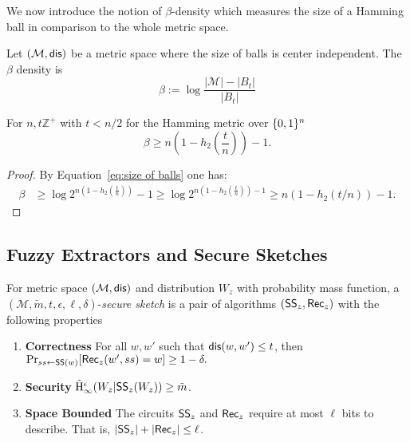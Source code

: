 \noindent
We now introduce the notion of $\beta$-density which measures the size of a Hamming ball in comparison to the whole metric space.
\begin{definition}
Let $(\mathcal{M}, \mathsf{dis})$ be a metric space where the size of balls is center independent.  The $\beta$ density is
\[
\beta := \log{\frac{|\mathcal{M}|- |B_t|}{|B_t|}} 
\]
\label{def:b density}
\end{definition}
\begin{claim} 
For $n, t\mathbb{Z}^+$ with $t<n/2$ for the Hamming metric over $\{0, 1\}^n$
\[
\beta \ge n\left(1-h_2\left(\frac{t}{n}\right)\right)-1.
\]

\end{claim}

\begin{proof}
By Equation~\ref{eq:size of balls} one has: 
\begin{align*}
\beta&\ge \log{2^{n\left(1-h_2\left(\frac{t}{n}\right)\right)} -1} \ge \log{2^{n\left(1-h_2\left(\frac{t}{n}\right)\right)-1} } \ge n(1-h_2(t/n))-1.
\end{align*}
\end{proof}


    \subsection{Fuzzy Extractors and Secure Sketches}
\begin{definition}
For metric space $(\mathcal{M}, \mathsf{dis})$ and distribution $W_z$ with probability mass function, a $(\mathcal{M}, \tilde{m}, t, \epsilon, \ell, \delta)$-\emph{secure sketch} is a pair of algorithms $({\mathsf{SS}}_z, {\mathsf{Rec}}_z)$ with the following properties 
\begin{enumerate} 
\itemsep0em
\item \textbf{Correctness} For all $w, w'$ such that $\mathsf{dis}(w, w')\le t$, then $\Pr_{ss \leftarrow {\ensuremath{\mathsf{SS}}}(w)}[{\mathsf{Rec}}_z(w', ss) = w]\ge 1-\delta.$
\item \textbf{Security}  $\tilde{\mathrm{H}}_\infty^\epsilon(W_z | {\mathsf{SS}}_z(W_z)) \ge \tilde{m}$.
\item \textbf{Space Bounded} The circuits ${\mathsf{SS}}_z$ and ${\mathsf{Rec}}_z$ require at most $\ell$ bits to describe.  That is, $|{\mathsf{SS}}_z| +|{\mathsf{Rec}}_z|\le \ell$.
\end{enumerate}
\end{definition}

